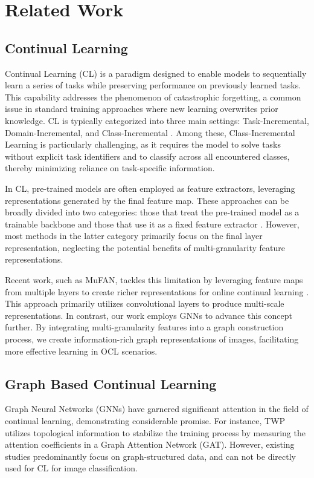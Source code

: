 \section{Related Work}
\subsection{Continual Learning}
Continual Learning (CL) is a paradigm designed to enable models to sequentially learn a series of tasks while preserving performance on previously learned tasks. This capability addresses the phenomenon of catastrophic forgetting, a common issue in standard training approaches where new learning overwrites prior knowledge. CL is typically categorized into three main settings: Task-Incremental, Domain-Incremental, and Class-Incremental \cite{vandeVen2019ThreeSF_threescenarios}. Among these, Class-Incremental Learning is particularly challenging, as it requires the model to solve tasks without explicit task identifiers and to classify across all encountered classes, thereby minimizing reliance on task-specific information.

In CL, pre-trained models are often employed as feature extractors, leveraging representations generated by the final feature map. These approaches can be broadly divided into two categories: those that treat the pre-trained model as a trainable backbone and those that use it as a fixed feature extractor \cite{jung2023new_mufan}. However, most methods in the latter category primarily focus on the final layer representation, neglecting the potential benefits of multi-granularity feature representations.

Recent work, such as MuFAN, tackles this limitation by leveraging feature maps from multiple layers to create richer representations for online continual learning \cite{jung2023new_mufan}. This approach primarily utilizes convolutional layers to produce multi-scale representations. In contrast, our work employs GNNs to advance this concept further. By integrating multi-granularity features into a graph construction process, we create information-rich graph representations of images, facilitating more effective learning in OCL scenarios.

\subsection{Graph Based Continual Learning}
Graph Neural Networks (GNNs) have garnered significant attention in the field of continual learning, demonstrating considerable promise. For instance, TWP \cite{Liu2020OvercomingCF_twp} utilizes topological information to stabilize the training process by measuring the attention coefficients in a Graph Attention Network (GAT). However, existing studies predominantly focus on graph-structured data, and can not be directly used for CL for image classification.

